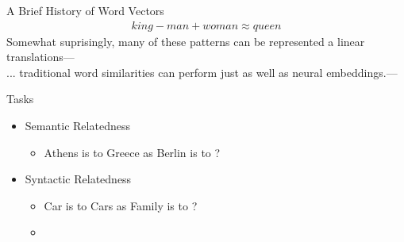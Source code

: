 \begin{frame}{A Brief History of Word Vectors}
  \begin{align*}
  king - man + woman \approx queen
  \end{align*}  
  \footnotesize{Somewhat suprisingly, many of these patterns can be represented a linear translations}---\cite{Mikolov13a} \\
  \footnotesize{... traditional word similarities can perform just as well as neural embeddings.}---\cite{Levy14}
\end{frame}

\begin{frame}{Tasks}
  \begin{itemize}
  \item Semantic Relatedness
    \begin{itemize}
      \item Athens is to Greece as Berlin is to ?
      \end{itemize}
  \item Syntactic Relatedness
    \begin{itemize}
      \item Car is to Cars as Family is to ?
      \item 
      \end{itemize}
  \end{itemize}
\end{frame}

